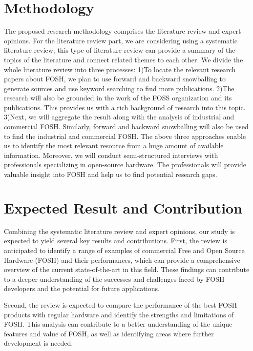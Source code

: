 \documentclass[conference]{IEEEtran}
\begin{document}
\section{Methodology}
The proposed research methodology comprises the literature review and expert opinions. For the literature review part, we are considering using a systematic literature review, this type of literature review can provide a summary of the topics of the literature and connect related themes to each other. We divide the whole literature review into three processes: 
1)To locate the relevant research papers about FOSH, we plan to use forward and backward snowballing to generate sources and use keyword searching to find more publications. 
2)The research will also be grounded in the work of the FOSS organization and its publications. This provides us with a rich background of research into this topic.
3)Next, we will aggregate the result along with the analysis of industrial and commercial FOSH. Similarly, forward and backward snowballing will also be used to find the industrial and commercial FOSH.
The above three approaches enable us to identify the most relevant resource from a huge amount of available information. 
Moreover, we will conduct semi-structured interviews with professionals specializing in open-source hardware. The professionals will provide valuable insight into FOSH and help us to find potential research gaps. 

\section{Expected Result and Contribution}

Combining the systematic literature review and expert opinions, our study is expected to yield several key results and contributions. First, the review is anticipated to identify a range of examples of commercial Free and Open Source Hardware (FOSH) and their performances, which can provide a comprehensive overview of the current state-of-the-art in this field. These findings can contribute to a deeper understanding of the successes and challenges faced by FOSH developers and the potential for future applications.

Second, the review is expected to compare the performance of the best FOSH products with regular hardware and identify the strengths and limitations of FOSH. This analysis can contribute to a better understanding of the unique features and value of FOSH, as well as identifying areas where further development is needed.
\end{document}
